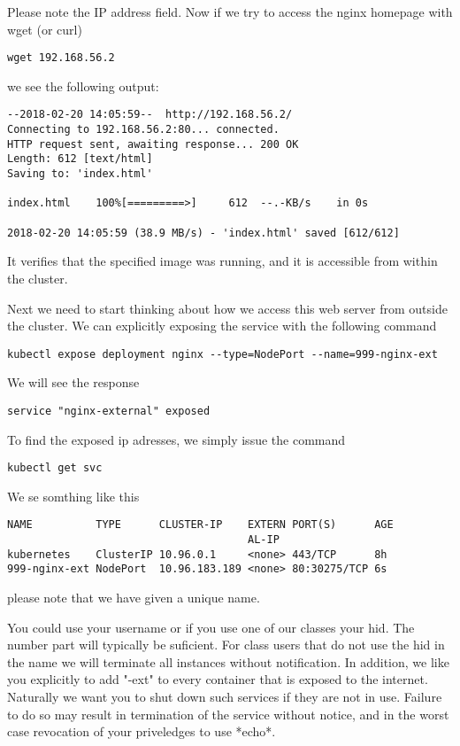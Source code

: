 Please note the IP address field. Now if we try to access the nginx
homepage with wget (or curl)

\begin{lstlisting}
wget 192.168.56.2
\end{lstlisting}

we see the following output:

\begin{lstlisting}
--2018-02-20 14:05:59--  http://192.168.56.2/
Connecting to 192.168.56.2:80... connected.
HTTP request sent, awaiting response... 200 OK
Length: 612 [text/html]
Saving to: 'index.html'

index.html    100%[=========>]     612  --.-KB/s    in 0s

2018-02-20 14:05:59 (38.9 MB/s) - 'index.html' saved [612/612]
\end{lstlisting}

It verifies that the specified image was running, and it is accessible
from within the cluster.

Next we need to start thinking about how we access this web server from
outside the cluster. We can explicitly exposing the service with the
following command

\begin{lstlisting}
kubectl expose deployment nginx --type=NodePort --name=999-nginx-ext
\end{lstlisting}

We will see the response

\begin{lstlisting}
service "nginx-external" exposed
\end{lstlisting}

To find the exposed ip adresses, we simply issue the command

\begin{lstlisting}
kubectl get svc
\end{lstlisting}

We se somthing like this

\begin{lstlisting}
NAME          TYPE      CLUSTER-IP    EXTERN PORT(S)      AGE
                                      AL-IP
kubernetes    ClusterIP 10.96.0.1     <none> 443/TCP      8h
999-nginx-ext NodePort  10.96.183.189 <none> 80:30275/TCP 6s
\end{lstlisting}

please note that we have given a unique name.

\begin{IU}

You could use your username or if you use one of our classes your
hid. The number part will typically be suficient.  For class users
that do not use the hid in the name we will terminate all instances
without notification. In addition, we like you explicitly to add
"-ext" to every container that is exposed to the internet. Naturally
we want you to shut down such services if they are not in use. Failure
to do so may result in termination of the service without notice, and
in the worst case revocation of your priveledges to use *echo*.

\end{IU}

